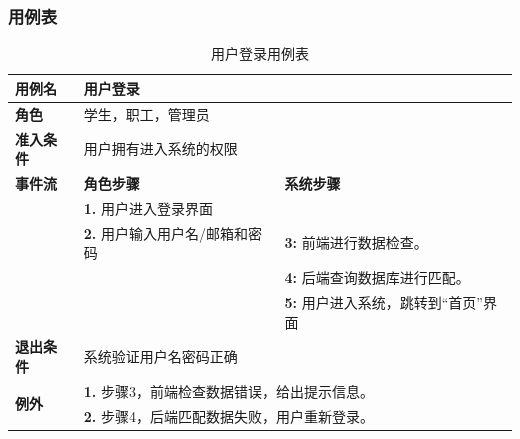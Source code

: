 \subsubsection{用例表} 

\begin{table}[H]
  \centering
  \renewcommand\arraystretch{1.1}
  \small
  \caption{用户登录用例表}
  \setlength{\tabcolsep}{4mm}
  \begin{tabular}{|p{2cm}|p{5.75cm}|p{5.75cm}|}
    \hline \textbf{用例名} & \multicolumn{2}{l|}{用户登录} \\
    \hline \textbf{角色} & \multicolumn{2}{l|}{学生，职工，管理员} \\
    \hline \textbf{准入条件} & \multicolumn{2}{l|}{用户拥有进入系统的权限} \\
    \hline \textbf{事件流} & \textbf{角色步骤} & \textbf{系统步骤} \\
    \hline \multirow{3}{*}{~} & \textbf{1.} 用户进入登录界面  &    \\
    \cline{2-3} & \textbf{2.} 用户输入用户名/邮箱和密码 & \textbf{3:} 前端进行数据检查。 \\
    \cline{2-3} &  & \textbf{4:} 后端查询数据库进行匹配。 \\
    \cline{2-3} &  & \textbf{5:} 用户进入系统，跳转到``首页''界面 \\
    \hline \textbf{退出条件}  & \multicolumn{2}{l|}{系统验证用户名密码正确} \\
    \hline \multirow{2}{*}{\textbf{例外}} & \multicolumn{2}{l|}{\textbf{1.} 步骤3，前端检查数据错误，给出提示信息。} \\
     & \multicolumn{2}{l|}{\textbf{2.} 步骤4，后端匹配数据失败，用户重新登录。} \\
    \hline
  \end{tabular}
\end{table}

